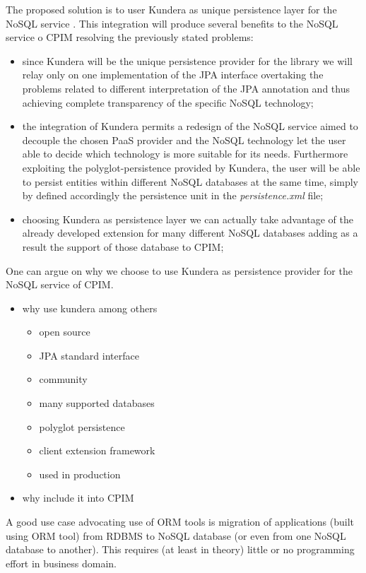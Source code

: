 \noindent The proposed solution is to user Kundera as unique persistence layer for the NoSQL service . This integration will produce several benefits to the NoSQL service o CPIM resolving the previously stated problems:
\begin{itemize}
\item since Kundera will be the unique persistence provider for the library we will relay only on one implementation of the JPA interface overtaking the problems related to different interpretation of the JPA annotation and thus achieving complete transparency of the specific NoSQL technology;
\item the integration of Kundera permits a redesign of the NoSQL service aimed to decouple the chosen PaaS provider and the NoSQL technology let the user able to decide which technology is more suitable for its needs. Furthermore exploiting the polyglot-persistence provided by Kundera, the user will be able to persist entities within different NoSQL databases at the same time, simply by defined accordingly the persistence unit in the \textit{persistence.xml} file;
\item choosing Kundera as persistence layer we can actually take advantage of the already developed extension for many different NoSQL databases adding as a result the support of those database to CPIM;
\end{itemize}

\noindent One can argue on why we choose to use Kundera as persistence provider for the NoSQL service of CPIM. 



\begin{itemize}
\item why use kundera among others
\begin{itemize}	
\item open source
\item JPA standard interface
\item community
\item many supported databases
\item polyglot persistence
\item client extension framework
\item used in production
\end{itemize}
\item why include it into CPIM
\end{itemize}

A good use case advocating use of ORM tools is migration of applications (built using ORM tool) from RDBMS to NoSQL database (or even from one NoSQL database to another). This requires (at least in theory) little or no programming effort in business domain.


